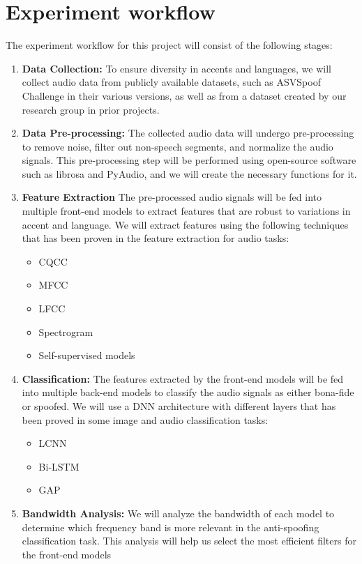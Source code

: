 \section{Experiment workflow}

The experiment workflow for this project will consist of the following stages:

\begin{enumerate}
    \item \textbf{Data Collection:} To ensure diversity in accents and languages, we will collect audio data from publicly available datasets, such as ASVSpoof Challenge \cite{yamagishi2021asvspoof} in their various versions, as well as from a dataset created by our research group in prior projects.
    \item \textbf{Data Pre-processing:} The collected audio data will undergo pre-processing to remove noise, filter out non-speech segments, and normalize the audio signals. This pre-processing step will be performed using open-source software such as librosa and PyAudio, and we will create the necessary functions for it.
    \item \textbf{Feature Extraction} The pre-processed audio signals will be fed into multiple front-end models to extract features that are robust to variations in accent and language. We will extract features using the following techniques that has been proven in the feature extraction for audio tasks: 
    \begin{itemize}
        \item \ac{CQCC}
        \item \ac{MFCC}
        \item \ac{LFCC}
        \item Spectrogram
        \item Self-supervised models
    \end{itemize}
    \item \textbf{Classification:} The features extracted by the front-end models will be fed into multiple back-end models to classify the audio signals as either bona-fide or spoofed. We will use a \ac{DNN} architecture with different layers that has been proved in some image and audio classification tasks:
    \begin{itemize}
        \item \ac{LCNN}
        \item \ac{Bi-LSTM}
        \item \ac{GAP}
    \end{itemize}
    \item \textbf{Bandwidth Analysis:} We will analyze the bandwidth of each model to determine which frequency band is more relevant in the anti-spoofing classification task. This analysis will help us select the most efficient filters for the front-end models

\end{enumerate}
